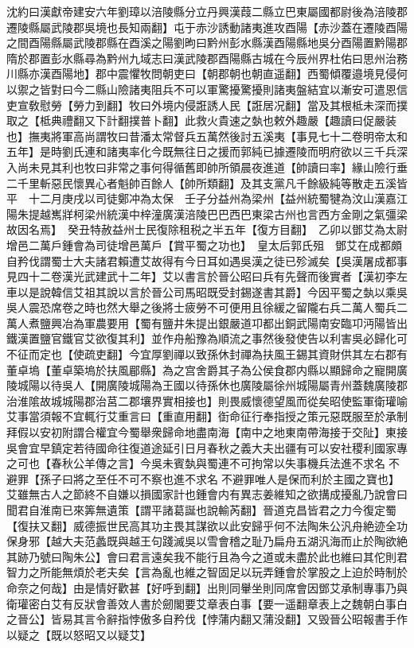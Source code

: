 沈約曰漢獻帝建安六年劉璋以涪陵縣分立丹興漢葭二縣立巴東屬國都尉後為涪陵郡遷陵縣屬武陵郡吳境也長知兩翻】屯于赤沙誘動諸夷進攻酉陽【赤沙蓋在遷陵酉陽之間酉陽縣屬武陵郡縣在酉溪之陽劉昫曰黔州彭水縣漢酉陽縣地吳分酉陽置黔陽郡隋於郡置彭水縣尋為黔州九域志曰漢武陵郡酉陽縣古城在今辰州界杜佑曰思州治務川縣亦漢酉陽地】郡中震懼牧問朝吏曰【朝郡朝也朝直遥翻】西蜀傾覆邉境見侵何以禦之皆對曰今二縣山險諸夷阻兵不可以軍驚擾驚擾則諸夷盤結宜以漸安可遣恩信吏宣敎慰勞【勞力到翻】牧曰外境内侵誑誘人民【誑居况翻】當及其根柢未深而撲取之【柢典禮翻又下計翻撲普卜翻】此救火貴速之埶也敕外趣嚴【趣讀曰促嚴装也】撫夷將軍高尚謂牧曰昔潘太常督兵五萬然後討五溪夷【事見七十二卷明帝太和五年】是時劉氏連和諸夷率化今既無往日之援而郭純已據遷陵而明府欲以三千兵深入尚未見其利也牧曰非常之事何得循舊即帥所領晨夜進道【帥讀曰率】緣山險行垂二千里斬惡民懷異心者魁帥百餘人【帥所類翻】及其支黨凡千餘級純等散走五溪皆平　十二月庚戌以司徒鄭冲為太保　壬子分益州為梁州【益州統蜀犍為汶山漢嘉江陽朱提越嶲牂柯梁州統漢中梓潼廣漢涪陵巴巴西巴東梁古州也言西方金剛之氣彊梁故因名焉】　癸丑特赦益州士民復除租税之半五年【復方目翻】　乙卯以鄧艾為太尉增邑二萬戶鍾會為司徒增邑萬戶【賞平蜀之功也】　皇太后郭氏殂　鄧艾在成都頗自矜伐謂蜀士大夫諸君賴遭艾故得有今日耳如遇吳漢之徒已殄滅矣【吳漢屠成都事見四十二卷漢光武建武十二年】艾以書言於晉公昭曰兵有先聲而後實者【漢初李左車以是說韓信艾祖其說以言於晉公司馬昭既受封錫遂書其爵】今因平蜀之埶以乘吳吳人震恐席卷之時也然大舉之後將士疲勞不可便用且徐緩之留隴右兵二萬人蜀兵二萬人煮鹽興冶為軍農要用【蜀有鹽井朱提出銀嚴道卭都出銅武陽南安臨卭沔陽皆出鐵漢置鹽官鐵官艾欲復其利】並作舟船豫為順流之事然後發使告以利害吳必歸化可不征而定也【使疏吏翻】今宜厚劉禪以致孫休封禪為扶風王錫其資財供其左右郡有董卓塢【董卓築塢於扶風郿縣】為之宫舍爵其子為公侯食郡内縣以顯歸命之寵開廣陵城陽以待吳人【開廣陵城陽為王國以待孫休也廣陵屬徐州城陽屬青州蓋魏廣陵郡治淮隂故城城陽郡治莒二郡壤界實相接也】則畏威懷德望風而從矣昭使監軍衛瓘喻艾事當須報不宜輒行艾重言曰【重直用翻】衘命征行奉指授之策元惡既服至於承制拜假以安初附謂合權宜今蜀舉衆歸命地盡南海【南中之地東南帶海接于交阯】東接吳會宜早鎮定若待國命往復道途延引日月春秋之義大夫出疆有可以安社稷利國家專之可也【春秋公羊傳之言】今吳未賓埶與蜀連不可拘常以失事機兵法進不求名不避罪【孫子曰將之至任不可不察也進不求名不避罪唯人是保而利於主國之寶也】艾雖無古人之節終不自嫌以損國家計也鍾會内有異志姜維知之欲搆成擾亂乃說會曰聞君自淮南已來筭無遺策【謂平諸葛誕也說輸芮翻】晉道克昌皆君之力今復定蜀【復扶又翻】威德振世民高其功主畏其謀欲以此安歸乎何不法陶朱公汎舟絶迹全功保身邪【越大夫范蠡既與越王句踐滅吳以雪會稽之耻乃扁舟五湖汎海而止於陶欲絶其跡乃號曰陶朱公】會曰君言遠矣我不能行且為今之道或未盡於此也維曰其佗則君智力之所能無煩於老夫矣【言為亂也維之智固足以玩弄鍾會於掌股之上迫於時制於命奈之何哉】由是情好歡甚【好呼到翻】出則同轝坐則同席會因鄧艾承制專事乃與衛瓘密白艾有反狀會善效人書於劒閣要艾章表白事【要一遥翻章表上之魏朝白事白之晉公】皆易其言令辭指悖傲多自矜伐【悖蒲内翻又蒲没翻】又毁晉公昭報書手作以疑之【既以怒昭又以疑艾】

